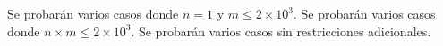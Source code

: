 \documentclass{oci}
\begin{document}
\begin{scoreDescription}
   Se probarán varios casos donde $n=1$ y $m\leq 2\times 10^3$.
   Se probarán varios casos donde $n\times m \leq 2\times 10^3$.
   Se probarán varios casos sin restricciones adicionales.
\end{scoreDescription}

\begin{sampleDescription}
\end{sampleDescription}
\end{document}
